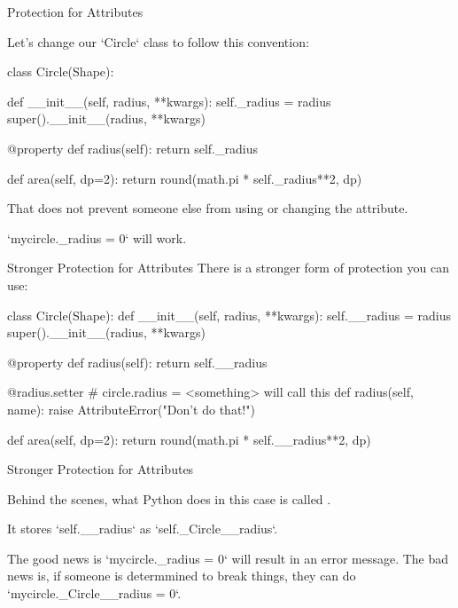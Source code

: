 \documentclass[aspectratio=149, handout] {beamer}
\begin{document}
\begin{frame}[fragile]{Protection for Attributes}
  
   \small
  Let's change our \inline`Circle` class to follow this convention:
 
  \begin{pythoncode}
    class Circle(Shape):

        def __init__(self, radius, **kwargs):
            self._radius = radius
            super().__init__(radius, **kwargs)

        @property
        def radius(self):
            return self._radius

        def area(self, dp=2):
            return round(math.pi * self._radius**2, dp)
  \end{pythoncode}

  That does not prevent someone else from using or changing the attribute.
  
  \inline`mycircle._radius = 0` will work.
  
\end{frame}


\begin{frame}[fragile]{Stronger Protection for Attributes}
  \small
  There is a stronger form of protection you can use:
  
  \begin{pythoncode}
    class Circle(Shape):
        def __init__(self, radius, **kwargs):
            self.__radius = radius
            super().__init__(radius, **kwargs)

        @property
        def radius(self):
            return self.__radius

        @radius.setter # circle.radius = <something>  will call this 
        def radius(self, name):
            raise AttributeError("Don't do that!")

        def area(self, dp=2):
            return round(math.pi * self.__radius**2, dp)
  \end{pythoncode}
\end{frame}

\begin{frame}[fragile]{Stronger Protection for Attributes}
  
  Behind the scenes, what Python does in this case is called
  .
  
  \bigskip
  
  It stores \inline`self.__radius` as \inline`self._Circle__radius`.

  \bigskip \pause
  
  The good news is \inline`mycircle._radius = 0` will result in an error message.
  The bad news is, if someone is determmined to break things, 
  they can do \inline`mycircle._Circle__radius = 0`.
  
  
\end{frame}
\end{document}
